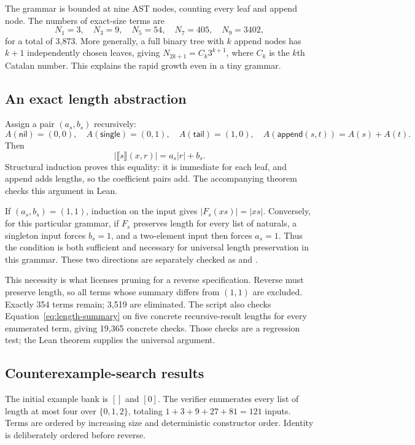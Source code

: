 The grammar is bounded at nine AST nodes, counting every leaf and append node.
The numbers of exact-size terms are
\[
 N_1=3,\quad N_3=9,\quad N_5=54,\quad N_7=405,\quad N_9=3402,
\]
for a total of 3,873. More generally, a full binary tree with $k$ append nodes
has $k+1$ independently chosen leaves, giving
$N_{2k+1}=C_k3^{k+1}$, where $C_k$ is the $k$th Catalan number. This explains the
rapid growth even in a tiny grammar.

\subsection{An exact length abstraction}

Assign a pair $(a_s,b_s)$ recursively:
\[
 A(\mathsf{nil})=(0,0),\quad
 A(\mathsf{single})=(0,1),\quad
 A(\mathsf{tail})=(1,0),\quad
 A(\mathsf{append}(s,t))=A(s)+A(t).
\]
Then
\begin{equation}\label{eq:length-summary}
 \bigl|\llbracket s\rrbracket(x,r)\bigr|=a_s|r|+b_s.
\end{equation}
Structural induction proves this equality: it is immediate for each leaf, and
append adds lengths, so the coefficient pairs add. The accompanying
 theorem checks this argument in Lean.

If $(a_s,b_s)=(1,1)$, induction on the input gives
$|F_s(xs)|=|xs|$. Conversely, for this particular grammar, if $F_s$ preserves
length for every list of naturals, a singleton input forces $b_s=1$, and a
two-element input then forces $a_s=1$. Thus the condition is both sufficient
and necessary for universal length preservation in this grammar. These two
directions are separately checked as  and
.

This necessity is what licenses pruning for a reverse specification. Reverse
must preserve length, so all terms whose summary differs from $(1,1)$ are
excluded. Exactly 354 terms remain; 3,519 are eliminated. The script also checks
Equation~\eqref{eq:length-summary} on five concrete recursive-result lengths
for every enumerated term, giving 19,365 concrete checks. Those checks are a
regression test; the Lean theorem supplies the universal argument.

\subsection{Counterexample-search results}

The initial example bank is $[]$ and $[0]$. The verifier enumerates every list
of length at most four over $\{0,1,2\}$, totaling
$1+3+9+27+81=121$ inputs. Terms are ordered by increasing size and deterministic
constructor order. Identity is deliberately ordered before reverse.


